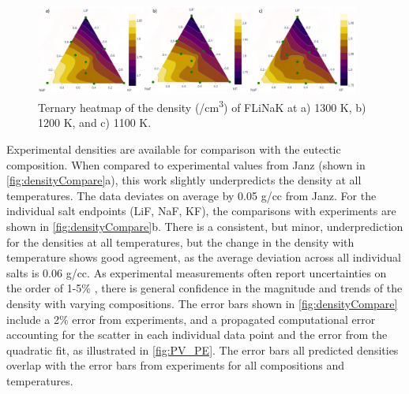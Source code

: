 \documentclass[preprint,12pt]{elsarticle}
\providecommand{\DIFadd}[1]{{\protect\color{blue} \sf #1}} %
\providecommand{\DIFaddbegin}{} %
\providecommand{\DIFaddend}{} %
\newcommand{\DIFaddincludegraphics}[2][]{{\color{blue}\fbox{\DIFOincludegraphics[#1]{#2}}}} %
\DeclareRobustCommand{\DIFaddbegin}{\DIFOaddbegin \let\includegraphics\DIFaddincludegraphics} %
\DeclareRobustCommand{\DIFaddend}{\DIFOaddend \let\includegraphics\DIFOincludegraphics} %
\begin{document}
\begin{figure}[h!]
    \centering
    \includegraphics[width=0.95\textwidth]{densityTernary_withScatter.png}
    \caption{Ternary heatmap of the density (/cm\textsuperscript{3}) of FLiNaK at a) 1300 K, b) 1200 K, and c) 1100 K.}
    \label{fig:densityHeat}
\end{figure}


Experimental densities are available for comparison with the eutectic composition. When compared to experimental values from Janz \cite{Janz1981} (shown in \cref{fig:densityCompare}a), this work slightly underpredicts the density at all temperatures. The data deviates on average by 0.05 g/cc from Janz. %
For the individual salt endpoints (LiF, NaF, KF), the comparisons with experiments are shown in \cref{fig:densityCompare}b. There is a consistent, but minor, underprediction for the densities at all temperatures, but the change in the density with temperature shows good agreement, as the average deviation across all individual salts is 0.06 g/cc. As experimental measurements often report uncertainties on the order of 1-5\% \cite{JanzSaltProp}, there is general confidence in the magnitude and trends of the density with varying compositions. \DIFaddbegin \DIFadd{The error bars shown in \cref{fig:densityCompare} include a 2\% error from experiments, and a propagated computational error accounting for the scatter in each individual data point and the error from the quadratic fit, as illustrated in \cref{fig:PV_PE}. The error bars all predicted densities overlap with the error bars from experiments for all compositions and temperatures. 
}\DIFaddend 
\end{document}
